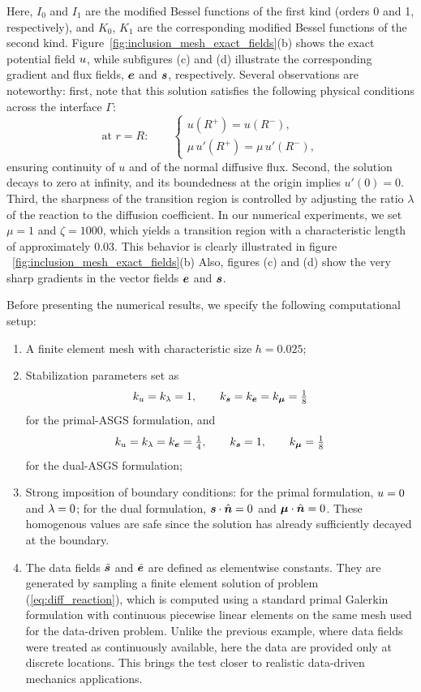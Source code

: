 Here, $I_{0}$ and $I_{1}$ are the modified Bessel functions of the first kind (orders 0 and 1, respectively), and $K_{0}$, $K_{1}$ are the corresponding modified Bessel functions of the second kind. Figure~\ref{fig:inclusion_mesh_exact_fields}(b) shows the exact potential field $u$, while subfigures (c) and (d) illustrate the corresponding gradient and flux fields, $\bm{e}$ and $\bm{s}$, respectively. Several observations are noteworthy: first, note that this solution satisfies the following physical conditions across the interface $\Gamma$:
$$
\text{at } r=R:\qquad
\begin{cases}
	u(R^{+}) = u(R^{-}), \\[3pt]
	\mu\,u'(R^{+}) = \mu\,u'(R^{-}),
\end{cases}
$$
ensuring continuity of $u$ and of the normal diffusive flux. 
Second, the solution decays to zero at infinity, and its boundedness at the origin implies $u'(0) = 0$. Third, the sharpness of the transition region is controlled by adjusting the ratio $\lambda$ of the reaction to the diffusion coefficient. In our numerical experiments, we set $\mu = 1$ and $\zeta = 1000$, which yields a transition region with a characteristic length of approximately $0.03$. This behavior is clearly illustrated in figure ~\ref{fig:inclusion_mesh_exact_fields}(b) Also, figures (c) and (d) show the very sharp gradients in the vector fields $\bm{e}$ and $\bm{s}$.

Before presenting the numerical results, we specify the following computational setup:
\begin{enumerate}
\item[(i)] A finite element mesh with characteristic size $h = 0.025$;
\item[(ii)] Stabilization parameters set as
\[
k_{u} = k_{\lambda} = 1, \qquad k_{\bm{s}} = k_{\bm{e}} = k_{\bm{\mu}} = \tfrac{1}{8}
\]
for the primal-ASGS formulation, and
\[
k_{u} = k_{\lambda} = k_{\bm{e}} = \tfrac{1}{4}, \qquad k_{\bm{s}} = 1, \qquad k_{\bm{\mu}} = \tfrac{1}{8}
\]
for the dual-ASGS formulation;

\item[(iii)] Strong imposition of boundary conditions: for the primal formulation, $u = 0$ and $\lambda = 0$; for the dual formulation, $\bm{s} \cdot \hat{\bm{n}} = 0$ and $\bm{\mu} \cdot \hat{\bm{n}} = 0$. These
homogenous values are safe since the solution has already sufficiently decayed at the boundary.

\item[(iv)] The data fields $\tilde{\bm{s}}$ and $\tilde{\bm{e}}$ are defined as elementwise constants. 
They are generated by sampling a finite element solution of problem (\ref{eq:diff_reaction}),
which is computed using a standard primal Galerkin formulation with continuous piecewise
linear elements on the same mesh used for the data-driven problem. Unlike the previous example, 
where data fields were treated as continuously available, here the data are provided only at
discrete locations. This brings the test closer to realistic data-driven mechanics applications.
\end{enumerate}

